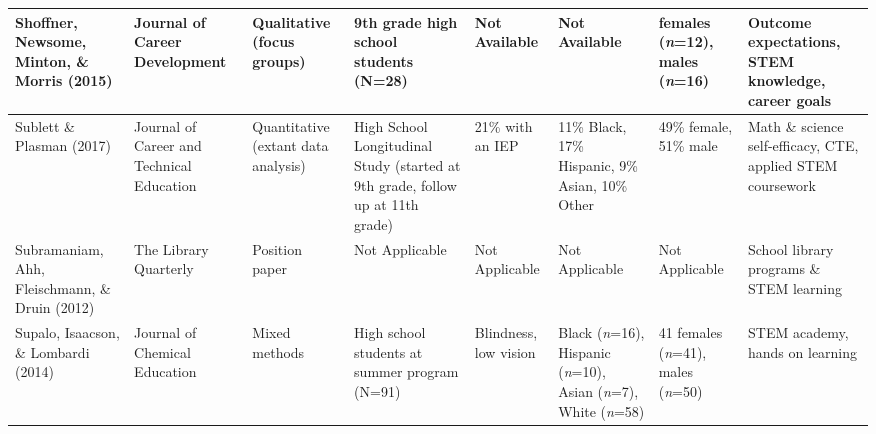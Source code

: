 \documentclass[11.5pt]{sig-alternate}
\begin{document}
\begin{@twocolumnfalse}
\begin{table}
\begin{tabular}{m{0.72in}m{0.72in}m{0.72in}m{0.72in}m{0.72in}m{0.72in}m{0.72in}m{0.72in}}
Shoffner, Newsome, Minton, \&  Morris (2015)         & Journal of Career Development                                   & Qualitative (focus groups)            & 9th grade high school students (N=28)                                                        &  \centering Not Available                                     &  \centering Not Available                                                                                          & females (\textit{n}=12), males (\textit{n}=16)                                     & Outcome expectations, STEM knowledge, career goals                                                       \\ \hline
Sublett \&  Plasman (2017)                           & Journal of Career and Technical Education                       & Quantitative (extant data analysis)   & High School Longitudinal Study (started at 9th grade, follow up at 11th grade)               & 21\% with an IEP                                  & 11\% Black, 17\% Hispanic, 9\% Asian, 10\% Other                                                       & 49\% female, 51\% male                                           & Math \& science self-efficacy, CTE, applied STEM coursework                                              \\ \hline
Subramaniam, Ahh, Fleischmann, \&  Druin (2012)      & The Library Quarterly                                           & Position paper                        &  \centering Not Applicable                                                                               &  \centering Not Applicable                                    &  \centering Not Applicable                                                                                         &  \centering Not Applicable                                                   & School library programs \& STEM learning                                                                 \\ \hline
Supalo, Isaacson, \&  Lombardi (2014)                & Journal of Chemical Education                                   & Mixed methods                         & High school students at summer program (N=91)                                                & Blindness, low vision                             & Black (\textit{n}=16), Hispanic (\textit{n}=10), Asian (\textit{n}=7), White (\textit{n}=58)                                               & 41 females (\textit{n}=41), males (\textit{n}=50)                                  & STEM academy, hands on learning                                                                          \\ \hline

\end{tabular}
\end{table}
\end{@twocolumnfalse}
\end{document}
